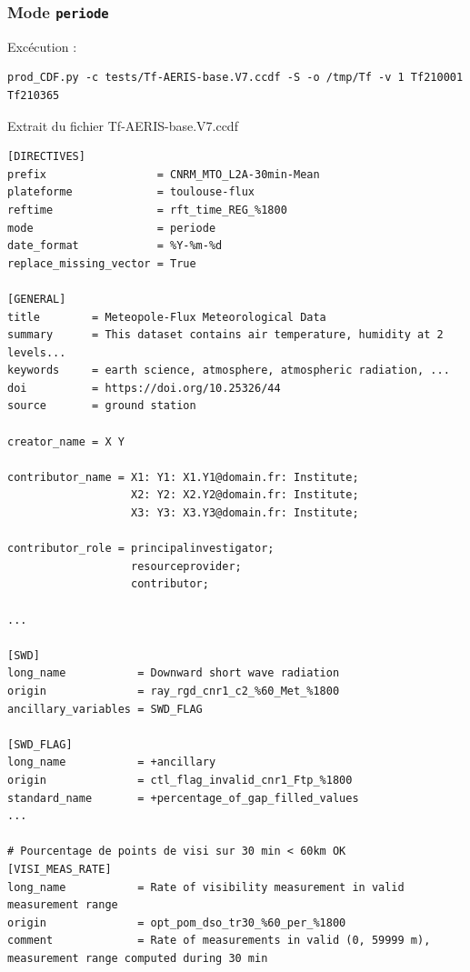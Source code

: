 \begin{landscape}

\subsubsection{Mode \texttt{periode}}

Excécution :

\begin{Verbatim}[fontsize=\myfontsize, commandchars=\\\{\}]
prod_CDF.py -c tests/Tf-AERIS-base.V7.ccdf -S -o /tmp/Tf -v 1 Tf210001 Tf210365
\end{Verbatim}

Extrait du fichier Tf-AERIS-base.V7.ccdf

\begin{Verbatim}[fontsize=\myfontsize, commandchars=\\\{\}]
[DIRECTIVES]
prefix                 = CNRM_MTO_L2A-30min-Mean
plateforme             = toulouse-flux
reftime                = rft_time_REG_%1800
mode                   = periode
date_format            = %Y-%m-%d
replace_missing_vector = True

[GENERAL]
title        = Meteopole-Flux Meteorological Data
summary      = This dataset contains air temperature, humidity at 2 levels...
keywords     = earth science, atmosphere, atmospheric radiation, ...
doi          = https://doi.org/10.25326/44
source       = ground station

creator_name = X Y

contributor_name = X1: Y1: X1.Y1@domain.fr: Institute;
                   X2: Y2: X2.Y2@domain.fr: Institute;
                   X3: Y3: X3.Y3@domain.fr: Institute;

contributor_role = principalinvestigator;
                   resourceprovider;
                   contributor;

...

[SWD]
long_name           = Downward short wave radiation
origin              = ray_rgd_cnr1_c2_%60_Met_%1800
ancillary_variables = SWD_FLAG

[SWD_FLAG]
long_name           = +ancillary
origin              = ctl_flag_invalid_cnr1_Ftp_%1800
standard_name       = +percentage_of_gap_filled_values
...

# Pourcentage de points de visi sur 30 min < 60km OK
[VISI_MEAS_RATE]
long_name           = Rate of visibility measurement in valid measurement range
origin              = opt_pom_dso_tr30_%60_per_%1800
comment             = Rate of measurements in valid (0, 59999 m), measurement range computed during 30 min


\end{Verbatim}
\end{landscape}
